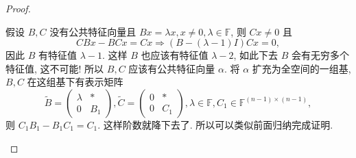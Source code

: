 \documentclass[../../main.tex]{subfiles}
\begin{document}
\begin{proof}
\begin{enumerate}
假设 \( B, C \) 没有公共特征向量且 \( Bx = \lambda x, x \neq 0, \lambda \in \mathbb{F} \), 则 \( Cx \neq 0 \) 且
\[
CBx - BCx = Cx \Rightarrow (B - (\lambda - 1)I)Cx = 0,
\]
因此 \( B \) 有特征值 \( \lambda - 1 \). 这样 \( B \) 也应该有特征值 \( \lambda - 2 \), 如此下去 \( B \) 会有无穷多个特征值, 这不可能! 所以 \( B, C \) 应该有公共特征向量 \( \alpha \). 将 \( \alpha \) 扩充为全空间的一组基, \( B, C \) 在这组基下有表示矩阵
\[
\widetilde{B} = \begin{pmatrix} \lambda & * \\ 0 & B_1 \end{pmatrix}, \widetilde{C} = \begin{pmatrix} 0 & * \\ 0 & C_1 \end{pmatrix}, \lambda \in \mathbb{F}, C_1 \in \mathbb{F}^{(n - 1) \times (n - 1)},
\]
则 \( C_1B_1 - B_1C_1 = C_1 \). 这样阶数就降下去了. 所以可以类似前面归纳完成证明.
\end{enumerate}

\end{proof}
\end{document}

